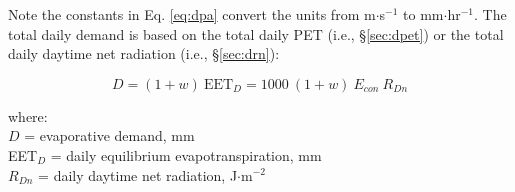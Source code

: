 \noindent Note the constants in Eq. \ref{eq:dpa} convert the units from m$\cdot$s$^{-1}$ to mm$\cdot$hr$^{-1}$. 
The total daily demand is based on the total daily PET (i.e., \S \ref{sec:dpet}) or the total daily daytime net radiation (i.e., \S \ref{sec:drn}):

\begin{equation}
\label{eq:daydp}
	D = \left(1+w\right)\:\text{EET}_D 
	  = 1000\:\left(1+w\right)\: E_{con}\: R_{Dn}
\end{equation}

\noindent where:\\
\indent $D$ = evaporative demand, mm\\
\indent EET$_D$ = daily equilibrium evapotranspiration, mm\\
\indent $R_{Dn}$ = daily daytime net radiation, J$\cdot$m$^{-2}$ \\

